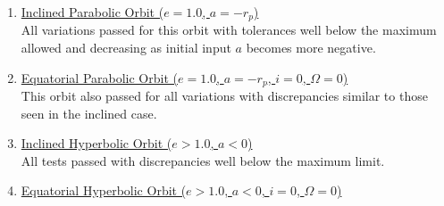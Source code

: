 \begin{itemize}
\begin{enumerate}
		\item \underline{Inclined Parabolic Orbit ($e=1.0$, \quad $a=-r_p$)}\\
		All variations passed for this orbit with tolerances well below the maximum allowed and decreasing as initial input $a$ becomes more negative. %
		\item \underline{Equatorial Parabolic Orbit ($e=1.0$, \quad $a=-r_p$, \quad $i=0$, \quad $\Omega=0$)}\\
		This orbit also passed for all variations with discrepancies similar to those seen in the inclined case. %
		\item \underline{Inclined Hyperbolic Orbit ($e>1.0$, \quad $a<0$)}\\
		All tests passed with discrepancies well below the maximum limit. %
		\item \underline{Equatorial Hyperbolic Orbit ($e>1.0$, \quad $a<0$, \quad $i=0$, \quad $\Omega = 0$)}\\

\end{enumerate}
\end{itemize}
